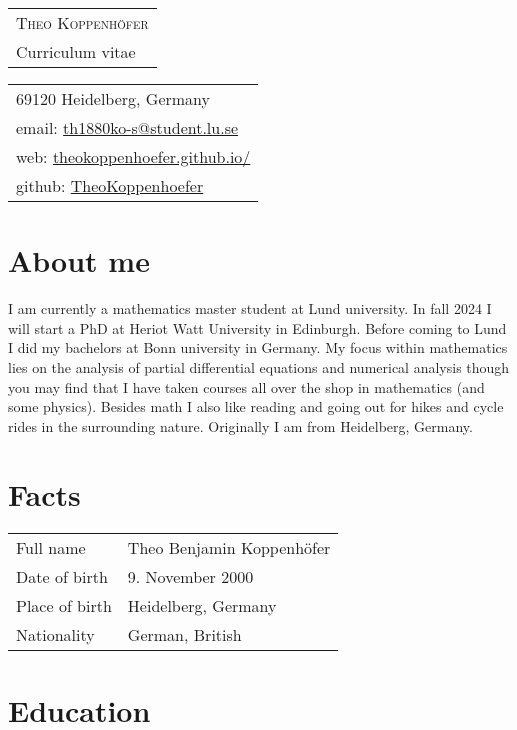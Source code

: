 \documentclass[11pt, letterpaper]{article}
\begin{document}
\begin{minipage}[t][1.25in][t]{.5\textwidth}
\begin{tabular}{@{}l@{}} %
\\
{\Huge\scshape Theo Koppenhöfer}\\[2.35ex]
{\large Curriculum vitae}
\end{tabular}
\end{minipage}
\hfill
\begin{minipage}[t][1.25in][t]{.4\textwidth}
\hfill
\begin{tabular}{l@{}}
69120 Heidelberg, Germany\\[1ex]
email: \href{mailto:th1880ko-s@student.lu.se}{th1880ko-s@student.lu.se} \\
web: \href{https://theokoppenhoefer.github.io/}{theokoppenhoefer.github.io/} \\
github: \href{https://github.com/TheoKoppenhoefer}{TheoKoppenhoefer}
\end{tabular}
\end{minipage}

\section{About me}
I am currently a mathematics master student at Lund university. In fall 2024 I will start a PhD at Heriot Watt University in Edinburgh.
Before coming to Lund I did my bachelors at Bonn university in Germany. My focus within
mathematics lies on the analysis of partial differential equations and numerical analysis
though you may find that I have taken courses all over the shop in mathematics (and some physics).
Besides math I also like reading and going out for hikes and cycle rides in the surrounding nature.
Originally I am from Heidelberg, Germany.

\section{Facts}
\begin{tabularx}{\textwidth}{>{\raggedright\arraybackslash}p{45mm} X}
  Full name & Theo Benjamin Koppenhöfer \\[0.5ex]
  Date of birth & 9. November 2000 \\[0.5ex]
  Place of birth & Heidelberg, Germany \\[0.5ex]
  Nationality & German, British
\end{tabularx}\section{Education}
\end{document}
